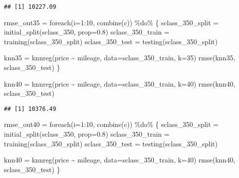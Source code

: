 \documentclass[
]{article}
\newenvironment{Shaded}{\begin{snugshade}}{\end{snugshade}}
\newcommand{\AttributeTok}[1]{\textcolor[rgb]{0.77,0.63,0.00}{#1}}
\newcommand{\DecValTok}[1]{\textcolor[rgb]{0.00,0.00,0.81}{#1}}
\newcommand{\FloatTok}[1]{\textcolor[rgb]{0.00,0.00,0.81}{#1}}
\newcommand{\FunctionTok}[1]{\textcolor[rgb]{0.00,0.00,0.00}{#1}}
\newcommand{\NormalTok}[1]{#1}
\newcommand{\OtherTok}[1]{\textcolor[rgb]{0.56,0.35,0.01}{#1}}
\newcommand{\SpecialCharTok}[1]{\textcolor[rgb]{0.00,0.00,0.00}{#1}}
\newcommand{\StringTok}[1]{\textcolor[rgb]{0.31,0.60,0.02}{#1}}
\begin{document}
\begin{verbatim}
## [1] 10227.09
\end{verbatim}

\begin{Shaded}
\begin{Highlighting}[]
\NormalTok{rmse\_out35 }\OtherTok{=} \FunctionTok{foreach}\NormalTok{(}\AttributeTok{i=}\DecValTok{1}\SpecialCharTok{:}\DecValTok{10}\NormalTok{, }\FunctionTok{combine}\NormalTok{(}\StringTok{\textquotesingle{}c\textquotesingle{}}\NormalTok{)) }\SpecialCharTok{\%do\%}\NormalTok{ \{}
\NormalTok{  sclass\_350\_split }\OtherTok{=} \FunctionTok{initial\_split}\NormalTok{(sclass\_350, }\AttributeTok{prop=}\FloatTok{0.8}\NormalTok{)}
\NormalTok{  sclass\_350\_train }\OtherTok{=} \FunctionTok{training}\NormalTok{(sclass\_350\_split)}
\NormalTok{  sclass\_350\_test }\OtherTok{=} \FunctionTok{testing}\NormalTok{(sclass\_350\_split)}
  
\NormalTok{  knn35 }\OtherTok{=} \FunctionTok{knnreg}\NormalTok{(price }\SpecialCharTok{\textasciitilde{}}\NormalTok{ mileage, }\AttributeTok{data=}\NormalTok{sclass\_350\_train, }\AttributeTok{k=}\DecValTok{35}\NormalTok{)}
  \FunctionTok{rmse}\NormalTok{(knn35, sclass\_350\_test)}
\NormalTok{\}}

\NormalTok{knn40 }\OtherTok{=} \FunctionTok{knnreg}\NormalTok{(price }\SpecialCharTok{\textasciitilde{}}\NormalTok{ mileage, }\AttributeTok{data=}\NormalTok{sclass\_350\_train, }\AttributeTok{k=}\DecValTok{40}\NormalTok{)}
\FunctionTok{rmse}\NormalTok{(knn40, sclass\_350\_test)}
\end{Highlighting}
\end{Shaded}

\begin{verbatim}
## [1] 10376.49
\end{verbatim}

\begin{Shaded}
\begin{Highlighting}[]
\NormalTok{rmse\_out40 }\OtherTok{=} \FunctionTok{foreach}\NormalTok{(}\AttributeTok{i=}\DecValTok{1}\SpecialCharTok{:}\DecValTok{10}\NormalTok{, }\FunctionTok{combine}\NormalTok{(}\StringTok{\textquotesingle{}c\textquotesingle{}}\NormalTok{)) }\SpecialCharTok{\%do\%}\NormalTok{ \{}
\NormalTok{  sclass\_350\_split }\OtherTok{=} \FunctionTok{initial\_split}\NormalTok{(sclass\_350, }\AttributeTok{prop=}\FloatTok{0.8}\NormalTok{)}
\NormalTok{  sclass\_350\_train }\OtherTok{=} \FunctionTok{training}\NormalTok{(sclass\_350\_split)}
\NormalTok{  sclass\_350\_test }\OtherTok{=} \FunctionTok{testing}\NormalTok{(sclass\_350\_split)}
  
\NormalTok{  knn40 }\OtherTok{=} \FunctionTok{knnreg}\NormalTok{(price }\SpecialCharTok{\textasciitilde{}}\NormalTok{ mileage, }\AttributeTok{data=}\NormalTok{sclass\_350\_train, }\AttributeTok{k=}\DecValTok{40}\NormalTok{)}
  \FunctionTok{rmse}\NormalTok{(knn40, sclass\_350\_test)}
\NormalTok{\}}
\end{Highlighting}
\end{Shaded}
\end{document}
